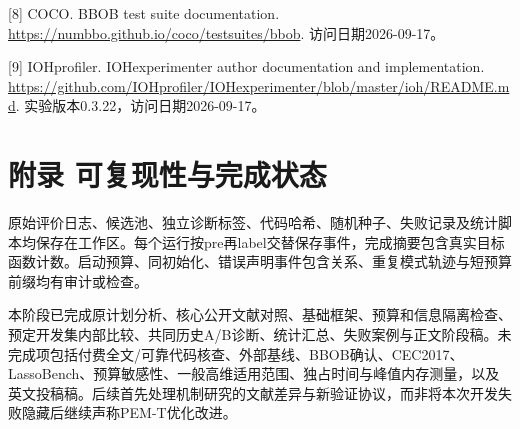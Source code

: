 \documentclass[11pt,a4paper]{article}
\begin{document}
{[}8{]} COCO. BBOB test suite documentation.
\url{https://numbbo.github.io/coco/testsuites/bbob}.
访问日期2026-09-17。

{[}9{]} IOHprofiler. IOHexperimenter author documentation and
implementation.
\url{https://github.com/IOHprofiler/IOHexperimenter/blob/master/ioh/README.md}.
实验版本0.3.22，访问日期2026-09-17。

\hypertarget{ux9644ux5f55-ux53efux590dux73b0ux6027ux4e0eux5b8cux6210ux72b6ux6001}{%
\section{附录
可复现性与完成状态}\label{ux9644ux5f55-ux53efux590dux73b0ux6027ux4e0eux5b8cux6210ux72b6ux6001}}

原始评价日志、候选池、独立诊断标签、代码哈希、随机种子、失败记录及统计脚本均保存在工作区。每个运行按pre再label交替保存事件，完成摘要包含真实目标函数计数。启动预算、同初始化、错误声明事件包含关系、重复模式轨迹与短预算前缀均有审计或检查。

本阶段已完成原计划分析、核心公开文献对照、基础框架、预算和信息隔离检查、预定开发集内部比较、共同历史A/B诊断、统计汇总、失败案例与正文阶段稿。未完成项包括付费全文/可靠代码核查、外部基线、BBOB确认、CEC2017、LassoBench、预算敏感性、一般高维适用范围、独占时间与峰值内存测量，以及英文投稿稿。后续首先处理机制研究的文献差异与新验证协议，而非将本次开发失败隐藏后继续声称PEM-T优化改进。
\end{document}
